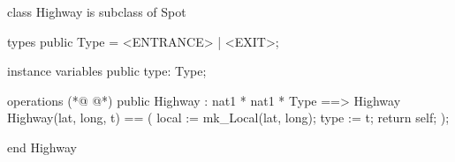 \begin{vdmpp}[breaklines=true]
class Highway is subclass of Spot

types
 public Type = <ENTRANCE> | <EXIT>;
 
instance variables
 public type: Type;
 
operations
(*@
\label{Highway:10}
@*)
 public Highway : nat1 * nat1 * Type ==> Highway
  Highway(lat, long, t) == (
   local := mk_Local(lat, long);
   type := t;
  return self;
 );
 
end Highway
\end{vdmpp}
